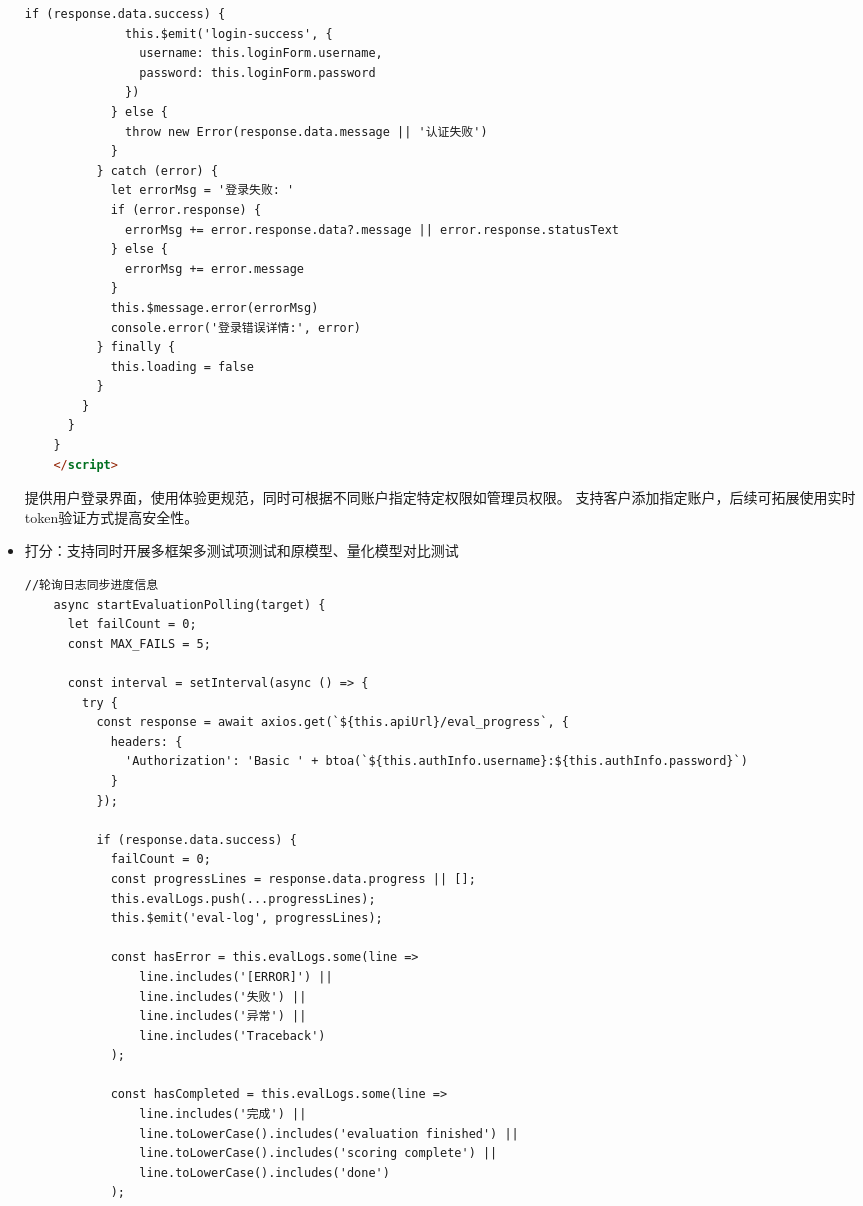 \documentclass[AutoFakeBold,AutoFakeSlant,language=chinese,degree=bachelor]{sustechthesis}
\begin{document}
\begin{itemize}
\begin{lstlisting}[language=HTML]
            if (response.data.success) {
              this.$emit('login-success', {
                username: this.loginForm.username,
                password: this.loginForm.password
              })
            } else {
              throw new Error(response.data.message || '认证失败')
            }
          } catch (error) {
            let errorMsg = '登录失败: '
            if (error.response) {
              errorMsg += error.response.data?.message || error.response.statusText
            } else {
              errorMsg += error.message
            }
            this.$message.error(errorMsg)
            console.error('登录错误详情:', error)
          } finally {
            this.loading = false
          }
        }
      }
    }
    </script>
    \end{lstlisting}
    提供用户登录界面，使用体验更规范，同时可根据不同账户指定特定权限如管理员权限。
    支持客户添加指定账户，后续可拓展使用实时token验证方式提高安全性。

    \item 打分：支持同时开展多框架多测试项测试和原模型、量化模型对比测试
    \begin{lstlisting}[language=HTML]
    //轮询日志同步进度信息
    async startEvaluationPolling(target) {
      let failCount = 0;
      const MAX_FAILS = 5;

      const interval = setInterval(async () => {
        try {
          const response = await axios.get(`${this.apiUrl}/eval_progress`, {
            headers: {
              'Authorization': 'Basic ' + btoa(`${this.authInfo.username}:${this.authInfo.password}`)
            }
          });

          if (response.data.success) {
            failCount = 0;
            const progressLines = response.data.progress || [];
            this.evalLogs.push(...progressLines);
            this.$emit('eval-log', progressLines);

            const hasError = this.evalLogs.some(line =>
                line.includes('[ERROR]') ||
                line.includes('失败') ||
                line.includes('异常') ||
                line.includes('Traceback')
            );

            const hasCompleted = this.evalLogs.some(line =>
                line.includes('完成') ||
                line.toLowerCase().includes('evaluation finished') ||
                line.toLowerCase().includes('scoring complete') ||
                line.toLowerCase().includes('done')
            );


\end{lstlisting}
\end{itemize}
\end{document}
